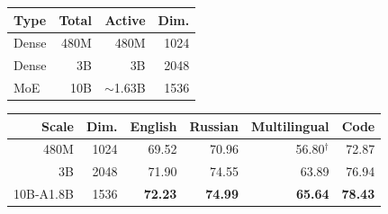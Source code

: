 \documentclass[11pt]{article}
\begin{document}
\begin{table}[!t]
  \centering
  \begin{minipage}[t]{0.35\textwidth}
    \vspace{0pt}
    \label{tab:architecture}
    \centering
    \small
    \setlength{\tabcolsep}{3.2pt}
    \begin{tabular}{lrrr}
      \toprule
      \textbf{Type} & \textbf{Total} & \textbf{Active} & \textbf{Dim.} \\
      \midrule
      Dense      & 480M & 480M & 1024 \\
      Dense      & 3B & 3B & 2048 \\
      MoE        & 10B & $\sim$1.63B & 1536 \\
      \bottomrule
    \end{tabular}
  \end{minipage}
  \hfill
  \begin{minipage}[t]{0.62\textwidth}
    \vspace{0pt}
    \label{tab:main}
    \centering
    \small
    \setlength{\tabcolsep}{3.5pt}
    \begin{tabular}{rrrrrr}
      \toprule
      \textbf{Scale} & \textbf{Dim.} & \textbf{English} & \textbf{Russian} & \textbf{Multilingual} & \textbf{Code} \\
      \midrule
      480M       & 1024 & 69.52 & 70.96 & 56.80$^{\dagger}$ & 72.87 \\
      3B         & 2048 & 71.90 & 74.55 & 63.89 & 76.94 \\
      10B-A1.8B  & 1536 & \textbf{72.23} & \textbf{74.99} & \textbf{65.64} & \textbf{78.43} \\
      \bottomrule
    \end{tabular}
  \end{minipage}
\end{table}
\end{document}
